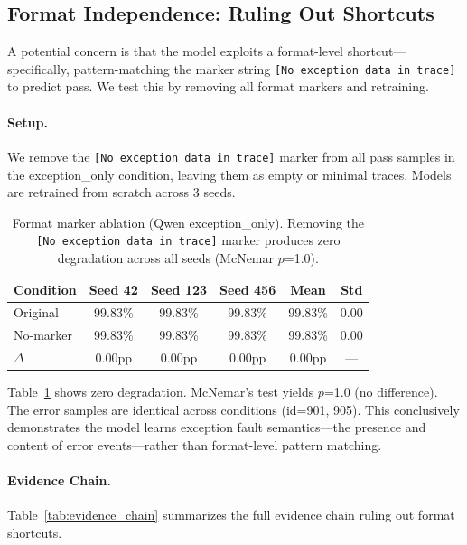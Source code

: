 \documentclass[11pt,a4paper]{article}
\begin{document}
\subsection{Format Independence: Ruling Out Shortcuts}

A potential concern is that the model exploits a format-level shortcut---specifically, pattern-matching the marker string \texttt{[No exception data in trace]} to predict pass. We test this by removing all format markers and retraining.

\paragraph{Setup.} We remove the \texttt{[No exception data in trace]} marker from all pass samples in the exception\_only condition, leaving them as empty or minimal traces. Models are retrained from scratch across 3 seeds.

\begin{table}[t]
\centering
\small
\begin{tabular}{lccccc}
\toprule
\textbf{Condition} & \textbf{Seed 42} & \textbf{Seed 123} & \textbf{Seed 456} & \textbf{Mean} & \textbf{Std} \\
\midrule
Original & 99.83\% & 99.83\% & 99.83\% & 99.83\% & 0.00 \\
No-marker & 99.83\% & 99.83\% & 99.83\% & 99.83\% & 0.00 \\
\midrule
$\Delta$ & 0.00pp & 0.00pp & 0.00pp & 0.00pp & --- \\
\bottomrule
\end{tabular}
\caption{Format marker ablation (Qwen exception\_only). Removing the \texttt{[No exception data in trace]} marker produces zero degradation across all seeds (McNemar $p$=1.0).}
\label{tab:nomarker}
\end{table}

Table~\ref{tab:nomarker} shows zero degradation. McNemar's test yields $p$=1.0 (no difference). The error samples are identical across conditions (id=901, 905). This conclusively demonstrates the model learns exception fault semantics---the presence and content of error events---rather than format-level pattern matching.

\paragraph{Evidence Chain.} Table~\ref{tab:evidence_chain} summarizes the full evidence chain ruling out format shortcuts.
\end{document}
